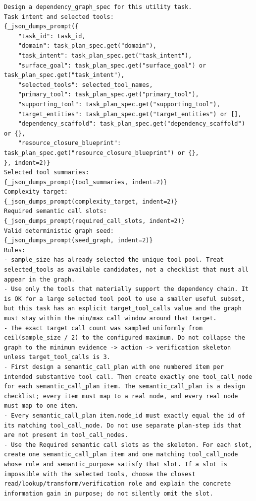 \begin{tcolorbox}[promptbox,title={Dependency Graph Planner Prompt}]
\setlength{\parindent}{0pt}
\begin{Verbatim}[breaklines=true, breakanywhere=true, fontsize=\scriptsize, breaksymbolleft={}]
Design a dependency_graph_spec for this utility task.
Task intent and selected tools:
{_json_dumps_prompt({
    "task_id": task_id,
    "domain": task_plan_spec.get("domain"),
    "task_intent": task_plan_spec.get("task_intent"),
    "surface_goal": task_plan_spec.get("surface_goal") or task_plan_spec.get("task_intent"),
    "selected_tools": selected_tool_names,
    "primary_tool": task_plan_spec.get("primary_tool"),
    "supporting_tool": task_plan_spec.get("supporting_tool"),
    "target_entities": task_plan_spec.get("target_entities") or [],
    "dependency_scaffold": task_plan_spec.get("dependency_scaffold") or {},
    "resource_closure_blueprint": task_plan_spec.get("resource_closure_blueprint") or {},
}, indent=2)}
Selected tool summaries:
{_json_dumps_prompt(tool_summaries, indent=2)}
Complexity target:
{_json_dumps_prompt(complexity_target, indent=2)}
Required semantic call slots:
{_json_dumps_prompt(required_call_slots, indent=2)}
Valid deterministic graph seed:
{_json_dumps_prompt(seed_graph, indent=2)}
Rules:
- sample_size has already selected the unique tool pool. Treat selected_tools as available candidates, not a checklist that must all appear in the graph.
- Use only the tools that materially support the dependency chain. It is OK for a large selected tool pool to use a smaller useful subset, but this task has an explicit target_tool_calls value and the graph must stay within the min/max call window around that target.
- The exact target call count was sampled uniformly from ceil(sample_size / 2) to the configured maximum. Do not collapse the graph to the minimum evidence -> action -> verification skeleton unless target_tool_calls is 3.
- First design a semantic_call_plan with one numbered item per intended substantive tool call. Then create exactly one tool_call_node for each semantic_call_plan item. The semantic_call_plan is a design checklist; every item must map to a real node, and every real node must map to one item.
- Every semantic_call_plan item.node_id must exactly equal the id of its matching tool_call_node. Do not use separate plan-step ids that are not present in tool_call_nodes.
- Use the Required semantic call slots as the skeleton. For each slot, create one semantic_call_plan item and one matching tool_call_node whose role and semantic_purpose satisfy that slot. If a slot is impossible with the selected tools, choose the closest read/lookup/transform/verification role and explain the concrete information gain in purpose; do not silently omit the slot.

\end{Verbatim}
\end{tcolorbox}
